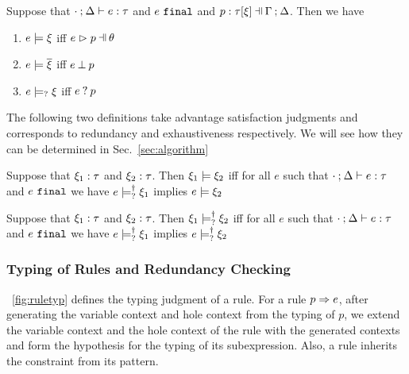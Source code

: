 \documentclass[runningheads,envcountsame,a4paper]{llncs}
\begin{document}
\begin{lemma}
  \label{lem:const-matching-coherence}
  Suppose that $\cdot \mathbin{;} \Delta \vdash e : \tau$ and $e ~\mathtt{final}$ and $\chpattyp{p}{\tau}{\xi}{\Gamma}{\Delta}$. Then we have
  \begin{enumerate}
  \item $e \models \xi$ iff $\hpatmatch{e}{p}{\theta}$
  \item $e \models \overline{\xi}$ iff $e \mathbin{\bot} p$
  \item $e \models_{?} \xi$ iff $e \mathbin{?} p$
  \end{enumerate}
\end{lemma}

The following two definitions take advantage satisfaction judgments and
corresponds to redundancy and exhaustiveness respectively. We will see how they
can be determined in Sec.~\ref{sec:algorithm}

\begin{definition}
  \label{defn:const-entailment}
  Suppose that $\xi_1 : \tau$ and $\xi_2 : \tau$.
  Then $\xi_1 \models \xi_2$ iff for all $e$ such that $\cdot \mathbin{;} \Delta \vdash e : \tau$ and $e ~\mathtt{final}$ we have $e \models_{?}^{\dag} \xi_1$ implies $e \models \xi_2$
\end{definition}

\begin{definition}
  \label{defn:nn-entailment}
  Suppose that $\xi_1 : \tau$ and $\xi_2 : \tau$. Then $\xi_1 \models_{?}^{\dag} \xi_2$ iff for all $e$ such that $\cdot \mathbin{;} \Delta \vdash e : \tau$ and $e ~\mathtt{final}$ we have $e \models_{?}^{\dag} \xi_1$ implies $e \models_{?}^{\dag} \xi_2$ 
\end{definition}

\subsubsection{Typing of Rules and Redundancy Checking}

 

\figurename~\ref{fig:ruletyp} defines the typing judgment of a rule. For a rule
$p \Rightarrow e$, after generating the variable context and hole context from the
typing of $p$, we extend the variable context and the hole context of the rule
with the generated contexts and form the hypothesis for the typing of its
subexpression. Also, a rule inherits the constraint from its pattern.
\end{document}
